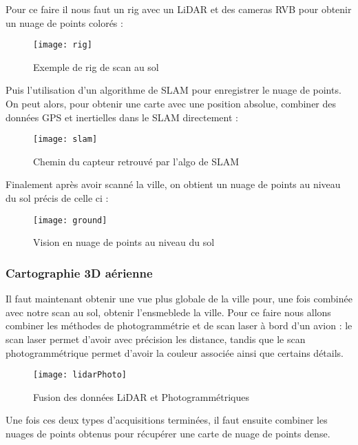 Pour ce faire il nous faut un rig avec un LiDAR et des cameras RVB pour obtenir un nuage de points colorés :
\begin{figure}[h]
    \centering
    \texttt{[image: rig]}
    \caption{Exemple de rig de scan au sol}
    \label{fig:solrig}
\end{figure}
\FloatBarrier

Puis l'utilisation d'un algorithme de SLAM pour enregistrer le nuage de points. On peut alors, pour obtenir une carte avec une position absolue, combiner des données GPS et inertielles dans le SLAM directement :

\begin{figure}[h]
    \centering
    \texttt{[image: slam]}
    \caption{Chemin du capteur retrouvé par l'algo de SLAM}
    \label{fig:solrig}
\end{figure}
\FloatBarrier

\newpage

Finalement après avoir scanné la ville, on obtient un nuage de points au niveau du sol précis de celle ci :
\begin{figure}[h]
    \centering
    \texttt{[image: ground]}
    \caption{Vision en nuage de points au niveau du sol}
    \label{fig:sol}
\end{figure}
\FloatBarrier

\subsubsection{Cartographie 3D aérienne}

Il faut maintenant obtenir une vue plus globale de la ville pour, une fois combinée avec notre scan au sol, obtenir l'ensmeblede la ville.
Pour ce faire nous allons combiner les méthodes de photogrammétrie et de scan laser à bord d'un avion : le scan laser permet d'avoir avec précision les distance, tandis que le scan photogrammétrique permet d'avoir  la couleur associée ainsi que certains détails.
\begin{figure}[h]
    \centering
    \texttt{[image: lidarPhoto]}
    \caption{Fusion des données LiDAR et Photogrammétriques}
    \label{fig:sol}
\end{figure}
\FloatBarrier

\newpage

Une fois ces deux types d'acquisitions terminées, il faut ensuite combiner les nuages de points obtenus pour récupérer une carte de nuage de points dense.
\newline

